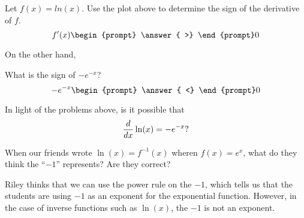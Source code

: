 \documentclass{ximera}
\begin{document}
\begin{problem}
  Let $f(x) = ln(x)$. Use the plot above to determine the sign of the derivative of $f$.  
  \[
   f'(x)
  \begin{prompt}
     \answer{ >}
  \end{prompt} 0
  \]
\end{problem}

On the other hand,

\begin{problem}
  What is the sign of $-e^{-x}$?
  \[
  -e^{-x} 
  \begin{prompt}
     \answer{ <}
  \end{prompt} 0
  \]
\end{problem}

\begin{problem}
In light of the problems above, is it possible that
\[
\frac{d}{\mathop{}\!d x} \ln(x) = -e^{-x}?
\]
\begin{multipleChoice}
\end{multipleChoice}
\end{problem}

\begin{problem}
	When our friends wrote $\ln(x) =f^{-1}(x)$ wheren $f(x)=e^{x}$, what do they think the ``$-1$'' represents?  Are they correct?
	\begin{freeResponse}
		Riley thinks that we can use the power rule on the $-1$, which tells us that the students are using $-1$ as an exponent for the exponential function.  However, in the case of inverse functions such as $\ln(x)$, the $-1$ is not an exponent.
	\end{freeResponse}
\end{problem}





\end{document}
